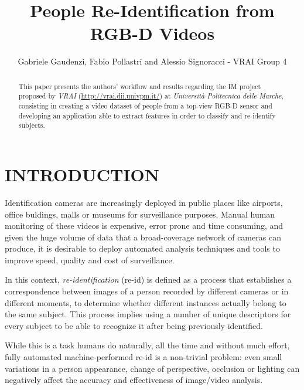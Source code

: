 \documentclass[letterpaper, 11pt, conference]{ieeeconf} %
\title{\LARGE \bf People Re-Identification from RGB-D Videos}
\author{Gabriele Gaudenzi, Fabio Pollastri and Alessio Signoracci - VRAI Group 4}
\begin{document}
\maketitle
\thispagestyle{empty}
\pagestyle{empty}

\begin{abstract}
This paper presents the authors' workflow and results regarding the IM project proposed by \emph{VRAI} (\url{http://vrai.dii.univpm.it/}) at \emph{Università Politecnica delle Marche}, consisting in creating a video dataset of people from a top-view RGB-D sensor and developing an application able to extract features in order to classify and re-identify subjects.
\end{abstract}

\section{INTRODUCTION}
Identification cameras are increasingly deployed in public places like airports, office buldings, malls or museums for surveillance purposes. Manual human monitoring of these videos is expensive, error prone and time consuming, and given the huge volume of data that a broad-coverage network of cameras can produce, it is desirable to deploy automated analysis techniques and tools to improve speed, quality and cost of surveillance\cite{c1}.

In this context, \emph{re-identification} (re-id) is defined as a process that establishes a correspondence between images of a person recorded by different cameras or in different moments, to determine whether different instances actually belong to the same subject. This process implies using a number of unique descriptors for every subject to be able to recognize it after being previously identified.

While this is a task humans do naturally, all the time and without much effort, fully automated machine-performed re-id is a non-trivial problem: even small variations in a person appearance, change of perspective, occlusion or lighting can negatively affect the accuracy and effectiveness of image\slash video analysis.
\end{document}
